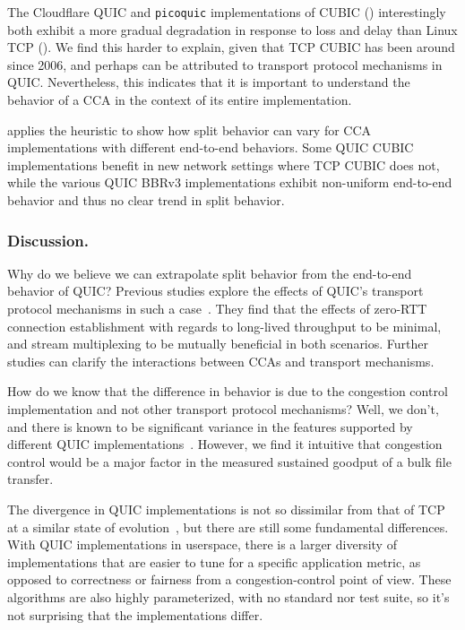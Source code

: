 The Cloudflare QUIC and \texttt{picoquic} implementations of CUBIC
() interestingly
both exhibit a more gradual degradation in response to loss and delay than Linux TCP
(). We
find this harder to explain, given that TCP CUBIC has been around since 2006,
and perhaps can be attributed to transport protocol mechanisms in QUIC.
Nevertheless, this indicates that it is important to understand the
behavior of a CCA in the context of its entire
implementation.



 applies the heuristic to show how split behavior
can vary for CCA implementations with different end-to-end behaviors.
Some QUIC CUBIC implementations
benefit in new network settings where TCP CUBIC does not, while the various
QUIC BBRv3 implementations exhibit non-uniform end-to-end behavior and thus no
clear trend in split behavior.

\subsubsection{Discussion.}

Why do we believe we can extrapolate split behavior from the end-to-end behavior
of QUIC? Previous studies explore the effects of QUIC's transport protocol
mechanisms in such a case~\cite{kosek2022quicpep,thomas2019google}. They find
that the effects of zero-RTT connection establishment with regards to
long-lived throughput to be minimal, and stream multiplexing to be mutually
beneficial in both scenarios. Further studies can clarify the interactions
between CCAs and transport mechanisms.

How do we know that the difference in behavior is due to the congestion control
implementation and not other transport protocol mechanisms? Well, we
don't, and there is known to be significant variance in the features supported
by different QUIC implementations~\cite{marx2020same}.
However, we find it intuitive that congestion control would be a major factor in
the measured sustained goodput of a bulk file transfer.

The divergence in QUIC implementations is not so dissimilar from that of TCP at
a similar state of evolution~\cite{allman1999effective}, but there are still
some fundamental differences. With QUIC implementations in userspace, there is
a larger diversity of implementations that are easier to tune for a specific
application metric, as opposed to correctness or fairness from a
congestion-control point of view. These algorithms are also highly
parameterized, with no standard nor test suite, so it's not surprising that the
implementations differ.

